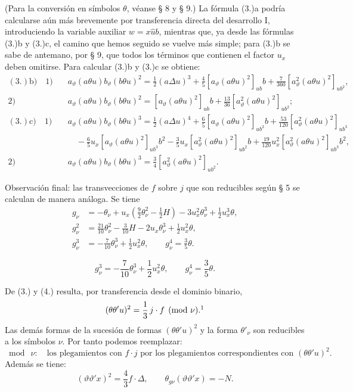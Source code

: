 \documentclass[11pt]{article}
\newcommand{\A}{\Delta}
\begin{document}
(Para la conversión en símbolos $\theta$, véanse § 8 y § 9.) La fórmula (3.)a podría calcularse aún más brevemente por transferencia directa del desarrollo I, introduciendo la variable auxiliar $w=x\widehat{u}b$, mientras que, ya desde las fórmulas (3.)b y (3.)c, el camino que hemos seguido se vuelve más simple; para (3.)b se sabe de antemano, por § 9, que todos los términos que contienen el factor $u_x$ deben omitirse. Para calcular (3.)b y (3.)c se obtiene:
\[
\begin{aligned}
(3.)\mathrm{b)}\quad 1)&\quad a_\vartheta(a\theta u)b_\vartheta(b\theta u)^2=\frac12(a\Delta u)^3+\frac45[a_\vartheta(a\theta u)^2]_{ub}b+\frac7{360}[a_\vartheta^2(a\theta u)^2]_{ub^2},\\
2)&\quad a_\vartheta(a\theta u)b_\vartheta(b\theta u)^2=[a_\vartheta(a\theta u)^2]_{ub}b+\frac{13}{36}[a_\vartheta^2(a\theta u)^2]_{ub^2};\\[.5em]
(3.)\mathrm{c)}\quad 1)&\quad a_\vartheta(a\theta u)b_\vartheta(b\theta u)^3=\frac12(a\Delta u)^4+\frac65[a_\vartheta(a\theta u)^2]_{ub^2}b+\frac{53}{120}[a_\vartheta^2(a\theta u)^2]_{ub^3}\\
&\qquad-\frac65u_x[a_\vartheta(a\theta u)^2]_{ub^3}b^2-\frac35u_x[a_\vartheta^2(a\theta u)^2]_{ub^2}b+\frac{19}{120}u_x^2[a_\vartheta^2(a\theta u)^2]_{ub^3}b^2,\\
2)&\quad a_\vartheta(a\theta u)b_\vartheta(b\theta u)^3=\frac34[a_\vartheta^2(a\theta u)^2]_{ub^2}.
\end{aligned}
\]

Observación final: las transvecciones de $f$ sobre $j$ que son reducibles según § 5 se calculan de manera análoga. Se tiene
\[
\tag{4}
\begin{aligned}
g_\nu&=-\theta_\nu+u_x\left(\frac92\theta_\nu^2-\frac12H\right)-3u_x^2\theta_\nu^3+\frac12u_x^3\theta,\\
g_\nu^2&=\frac{21}{10}\theta_\nu^2-\frac3{10}H-2u_x\theta_\nu^3+\frac12u_x^2\theta,\\
g_\nu^3&=-\frac7{10}\theta_\nu^3+\frac12u_x^2\theta,\qquad g_\nu^4=\frac35\theta.
\end{aligned}
\]

\[
\tag{4}
g_\nu^3=-\frac7{10}\theta_\nu^3+\frac12u_x^2\theta,
\qquad
g_\nu^4=\frac35\theta.
\]

De (3.) y (4.) resulta, por transferencia desde el dominio binario,
\[
(\theta\theta'u)^2=\frac13\,j\cdot f\pmod{\nu}.\footnotemark
\]
Las demás formas de la sucesión de formas $(\theta\theta'u)^2$ y la forma $\theta'_\nu$ son reducibles a los símbolos $\nu$. Por tanto podemos reemplazar:
\[
\bmod\ \nu:\quad \text{los plegamientos con } f\cdot j
\text{ por los plegamientos correspondientes con }(\theta\theta'u)^2.
\]
Además se tiene:
\[
(\vartheta\vartheta'x)^2=\frac43 f\cdot\A,
\qquad
\theta_{g\nu}(\vartheta\vartheta'x)=-N.
\]
\end{document}
